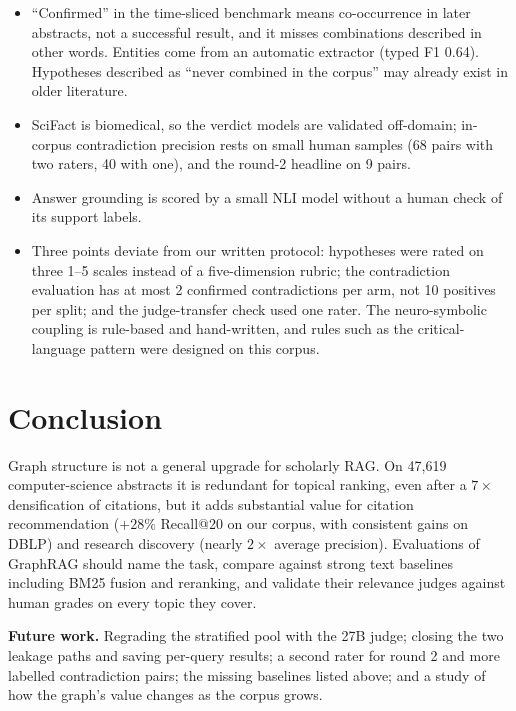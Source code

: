 \documentclass[conference]{IEEEtran}
\begin{document}
\begin{itemize}
\item ``Confirmed'' in the time-sliced benchmark means co-occurrence in later abstracts, not a successful result, and it misses combinations described in other words. Entities come from an automatic extractor (typed F1 0.64). Hypotheses described as ``never combined in the corpus'' may already exist in older literature.
\item SciFact is biomedical, so the verdict models are validated off-domain; in-corpus contradiction precision rests on small human samples (68 pairs with two raters, 40 with one), and the round-2 headline on 9 pairs.
\item Answer grounding is scored by a small NLI model without a human check of its support labels.
\item Three points deviate from our written protocol: hypotheses were rated on three 1--5 scales instead of a five-dimension rubric; the contradiction evaluation has at most 2 confirmed contradictions per arm, not 10 positives per split; and the judge-transfer check used one rater. The neuro-symbolic coupling is rule-based and hand-written, and rules such as the critical-language pattern were designed on this corpus.
\end{itemize}

\section{Conclusion}

Graph structure is not a general upgrade for scholarly RAG. On 47,619 computer-science abstracts it is redundant for topical ranking, even after a $7\times$ densification of citations, but it adds substantial value for citation recommendation ($+28\%$ Recall@20 on our corpus, with consistent gains on DBLP) and research discovery (nearly $2\times$ average precision). Evaluations of GraphRAG should name the task, compare against strong text baselines including BM25 fusion and reranking, and validate their relevance judges against human grades on every topic they cover.

\textbf{Future work.} Regrading the stratified pool with the 27B judge; closing the two leakage paths and saving per-query results; a second rater for round 2 and more labelled contradiction pairs; the missing baselines listed above; and a study of how the graph's value changes as the corpus grows.
\end{document}
